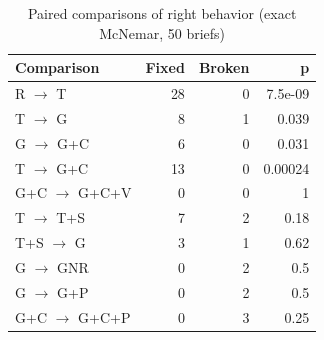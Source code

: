 \begin{table}[t]
\centering\small
\caption{Paired comparisons of right behavior (exact McNemar, 50 briefs)}
\label{tab:t5_x2_mcnemar}
\begin{tabular}{lrrr}
\toprule
Comparison & Fixed & Broken & p \\
\midrule
R $\rightarrow$ T & 28 & 0 & 7.5e-09 \\
T $\rightarrow$ G & 8 & 1 & 0.039 \\
G $\rightarrow$ G+C & 6 & 0 & 0.031 \\
T $\rightarrow$ G+C & 13 & 0 & 0.00024 \\
G+C $\rightarrow$ G+C+V & 0 & 0 & 1 \\
T $\rightarrow$ T+S & 7 & 2 & 0.18 \\
T+S $\rightarrow$ G & 3 & 1 & 0.62 \\
G $\rightarrow$ GNR & 0 & 2 & 0.5 \\
G $\rightarrow$ G+P & 0 & 2 & 0.5 \\
G+C $\rightarrow$ G+C+P & 0 & 3 & 0.25 \\
\bottomrule
\end{tabular}
\end{table}
